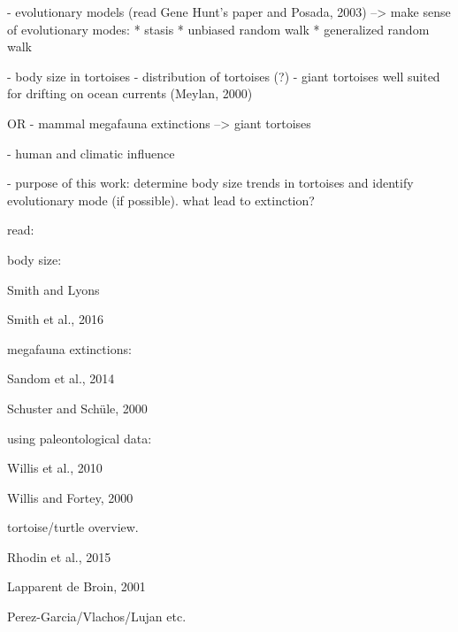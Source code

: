 - evolutionary models (read Gene Hunt's paper and Posada, 2003)
-->  make sense of evolutionary modes:
* stasis
* unbiased random walk
* generalized random walk


- body size in tortoises %
- distribution of tortoises (?)
- giant tortoises well suited for drifting on ocean currents (Meylan, 2000)

OR
- mammal megafauna extinctions --> giant tortoises

- human and climatic influence

- purpose of this work: determine body size trends in tortoises and identify evolutionary mode (if possible). what lead to extinction?




read:

body size:

Smith and Lyons

Smith et al., 2016

megafauna extinctions:

Sandom et al., 2014

Schuster and Schüle, 2000

using paleontological data:

Willis et al., 2010

Willis and Fortey, 2000

tortoise/turtle overview.

Rhodin et al., 2015

Lapparent de Broin, 2001

Perez-Garcia/Vlachos/Lujan etc.




